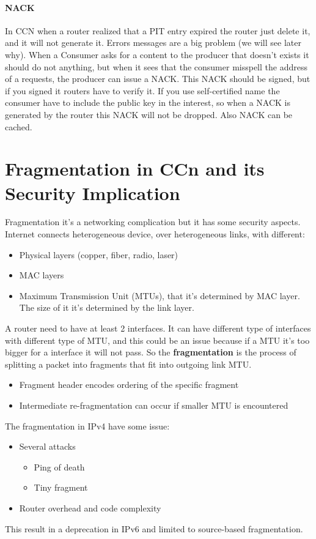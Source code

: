 \paragraph*{NACK} In CCN when a router realized that a PIT entry expired the
router just delete it, and it will not generate it. Errors messages are a big
problem (we will see later why). When a Consumer asks for a content to the
producer that doesn't exists it should do not anything, but when it sees that
the consumer misspell the address of a requests, the producer can issue a NACK.
This NACK should be signed, but if you signed it routers have to verify it.
If you use self-certified name the consumer have to include the public key in
the interest, so when a NACK is generated by the router this NACK will not be
dropped. Also NACK can be cached.

\section{Fragmentation in CCn and its Security Implication}
Fragmentation it's a networking complication but it has some security aspects.
Internet connects heterogeneous device, over heterogeneous links, with
different:
\begin{itemize}
  \item Physical layers (copper, fiber, radio, laser)
  \item MAC layers
  \item Maximum Transmission Unit (MTUs), that it's determined by MAC layer.
The size of it it's determined by the link layer.
\end{itemize}

A router need to have at least 2 interfaces. It can have different type of
interfaces with different type of MTU, and this could be an issue because if a
MTU it's too bigger for a interface it will not pass.
So the \textbf{fragmentation} is the process of splitting a packet into
fragments that fit into outgoing link MTU.
\begin{itemize}
  \item Fragment header encodes ordering of the specific fragment
  \item Intermediate re-fragmentation can occur if smaller MTU is encountered
\end{itemize}

The fragmentation in IPv4 have some issue:
\begin{itemize}
  \item Several attacks
  \begin{itemize}
    \item Ping of death
    \item Tiny fragment
  \end{itemize}
  \item Router overhead and code complexity
\end{itemize}
This result in a deprecation in IPv6 and limited to source-based fragmentation.

